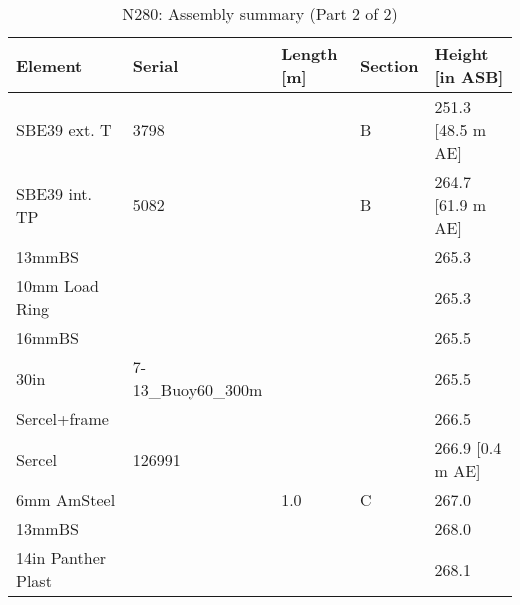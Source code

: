 \documentclass{article}
\begin{document}
\begin{table}[!htbp]
\centering
\caption{N280: Assembly summary (Part 2 of 2)}
\begin{tabular}{lllll}
\toprule
Element & Serial & Length [m] & Section & Height [in ASB] \\
\midrule
SBE39 ext. T & 3798 &  & B & 251.3 [48.5 m AE] \\
SBE39 int. TP & 5082 &  & B & 264.7 [61.9 m AE] \\
13mmBS &  &  &  & 265.3 \\
10mm Load Ring &  &  &  & 265.3 \\
16mmBS &  &  &  & 265.5 \\
30in & 7-13\_Buoy60\_300m &  &  & 265.5 \\
Sercel+frame &  &  &  & 266.5 \\
Sercel & 126991 &  &  & 266.9 [0.4 m AE] \\
6mm AmSteel &  & 1.0 & C & 267.0 \\
13mmBS &  &  &  & 268.0 \\
14in Panther Plast &  &  &  & 268.1 \\
\bottomrule
\end{tabular}
\end{table}
\end{document}
